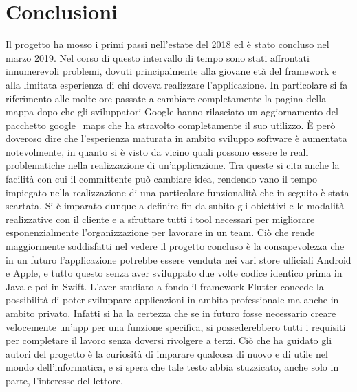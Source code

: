 \chapter{Conclusioni}
Il progetto ha mosso i primi passi nell'estate del 2018 ed è stato concluso nel
marzo 2019. Nel corso di questo intervallo di tempo sono stati affrontati
innumerevoli problemi, dovuti principalmente alla giovane età del framework e
alla limitata esperienza di chi doveva realizzare l'applicazione.
In particolare si fa riferimento alle molte ore passate a cambiare completamente la pagina della
mappa dopo che gli sviluppatori Google hanno rilasciato un aggiornamento del
pacchetto google\_maps che ha stravolto completamente il suo utilizzo. \`E però
doveroso dire che l'esperienza maturata in ambito sviluppo software è aumentata
notevolmente, in quanto si è visto da vicino quali possono essere le reali
problematiche nella realizzazione di un'applicazione. Tra queste si cita anche
la facilità con cui il committente può cambiare idea, rendendo vano il tempo
impiegato nella realizzazione di una particolare funzionalità che in seguito è
stata scartata. Si è imparato dunque a definire fin da subito gli obiettivi e le
modalità realizzative con il cliente e a sfruttare tutti i tool necessari per
migliorare esponenzialmente l'organizzazione per lavorare in un team. Ciò che
rende maggiormente soddisfatti nel vedere il progetto concluso è la
consapevolezza che in un futuro l'applicazione potrebbe essere venduta nei vari
store ufficiali Android e Apple, e tutto questo senza aver sviluppato due volte
codice identico prima in Java e poi in Swift. L'aver studiato a fondo il
framework Flutter concede la possibilità di poter sviluppare applicazioni in
ambito professionale ma anche in ambito privato. Infatti si ha la certezza che
se in futuro fosse necessario creare velocemente un'app per una funzione
specifica, si possederebbero tutti i requisiti per completare il lavoro senza
doversi rivolgere a terzi. Ciò che ha guidato gli autori del progetto è la
curiosità di imparare qualcosa di nuovo e di utile nel mondo dell'informatica, e
si spera che tale testo abbia stuzzicato, anche solo in parte, l'interesse del lettore.  